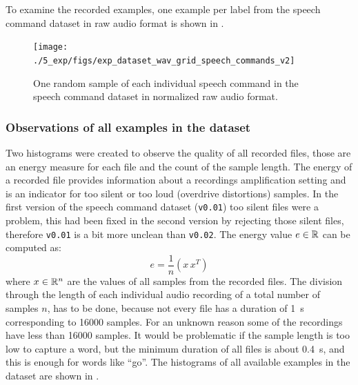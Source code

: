 To examine the recorded examples, one example per label from the speech command dataset in raw audio format is shown in .
\begin{figure}[!ht]
  \centering
    \texttt{[image: ./5\_exp/figs/exp\_dataset\_wav\_grid\_speech\_commands\_v2]}
  \caption{One random sample of each individual speech command in the speech command dataset in normalized raw audio format.}
  \label{fig:exp_dataset_wav_grid_speech_commands_v2}
\end{figure}
\FloatBarrier
\noindent



\subsubsection{Observations of all examples in the dataset}
Two histograms were created to observe the quality of all recorded files, those are an energy measure for each file and the count of the sample length.
The energy of a recorded file provides information about a recordings amplification setting and is an indicator for too silent or too loud (overdrive distortions) samples. 
In the first version of the speech command dataset (\texttt{v0.01}) too silent files were a problem, this had been fixed in the second version by rejecting those silent files, therefore \texttt{v0.01} is a bit more unclean than \texttt{v0.02}.
The energy value $e \in \mathbb{R}$ can be computed as:
\begin{equation}\label{eq:exp_dataset_energy}
  e = \frac{1}{n} \left( x\, x^T \right)
\end{equation}
where $x \in \mathbb{R}^n$ are the values of all samples from the recorded files.
The division through the length of each individual audio recording of a total number of samples $n$, has to be done, because not every file has a duration of \SI{1}{\second} corresponding to 16000 samples.
For an unknown reason some of the recordings have less than 16000 samples.
It would be problematic if the sample length is too low to capture a word, but the minimum duration of all files is about \SI{0.4}{\second}, and this is enough for words like \enquote{go}.
The histograms of all available examples in the dataset are shown in .

